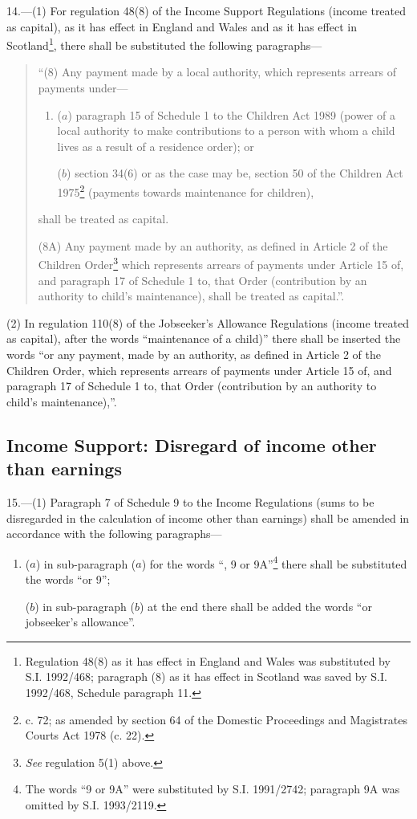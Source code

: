 \documentclass[12pt,a4paper]{article}
\begin{document}
14.---(1)  For regulation 48(8) of the Income Support Regulations (income treated as capital), as it has effect in England and Wales and as it has effect in Scotland\footnote{\frenchspacing Regulation 48(8) as it has effect in England and Wales was substituted by S.I. 1992/468; paragraph (8) as it has effect in Scotland was saved by S.I. 1992/468, Schedule paragraph 11.}, there shall be substituted the following paragraphs—
\begin{quotation}
“(8) Any payment made by a local authority, which represents arrears of payments under—
\begin{enumerate}\item[]
($a$) paragraph 15 of Schedule 1 to the Children Act 1989 (power of a local authority to make contributions to a person with whom a child lives as a result of a residence order); or

($b$) section 34(6) or as the case may be, section 50 of the Children Act 1975\footnote{ c. 72; as amended by section 64 of the Domestic Proceedings and Magistrates Courts Act 1978 (c. 22).} (payments towards maintenance for children),
\end{enumerate}
shall be treated as capital.

(8A) Any payment made by an authority, as defined in Article 2 of the Children Order\footnote{\frenchspacing \emph{See} regulation 5(1) above.} which represents arrears of payments under Article 15 of, and paragraph 17 of Schedule 1 to, that Order (contribution by an authority to child’s maintenance), shall be treated as capital.”.
\end{quotation}

(2) In regulation 110(8) of the Jobseeker’s Allowance Regulations (income treated as capital), after the words “maintenance of a child)” there shall be inserted the words “or any payment, made by an authority, as defined in Article 2 of the Children Order, which represents arrears of payments under Article 15 of, and paragraph 17 of Schedule 1 to, that Order (contribution by an authority to child’s maintenance),”.

\subsection[15. Income Support: Disregard of income other than earnings]{Income Support: Disregard of income other than earnings}

15.---(1)  Paragraph 7 of Schedule 9 to the Income Regulations (sums to be disregarded in the calculation of income other than earnings) shall be amended in accordance with the following paragraphs—
\begin{enumerate}\item[]
($a$) in sub-paragraph ($a$)  for the words “, 9 or 9A”\footnote{\frenchspacing The words “9 or 9A” were substituted by S.I. 1991/2742; paragraph 9A was omitted by S.I. 1993/2119.} there shall be substituted the words “or 9”;

($b$) in sub-paragraph ($b$)  at the end there shall be added the words “or jobseeker’s allowance”.
\end{enumerate}
\end{document}
